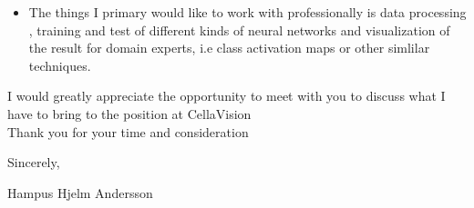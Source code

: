 \documentclass[]{article}
\providecommand{\tightlist}{%
  \setlength{\itemsep}{0pt}\setlength{\parskip}{0pt}}
\begin{document}
\begin{itemize}
\item
  The things I primary would like to work with professionally is data processing
, training and test of different kinds of neural networks and visualization of
the result for domain experts, i.e class activation maps or other
 simlilar techniques.



\end{itemize}

I would greatly appreciate the opportunity to meet with you to discuss
what I have to bring to the position at CellaVision\\


Thank you for your time and consideration

Sincerely,

Hampus Hjelm Andersson
\end{document}
